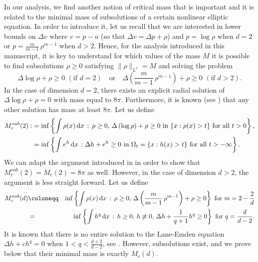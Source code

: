 \documentclass[11pt,a4paper]{article}
\numberwithin{equation}{section}
\theoremstyle{plain}
\theoremstyle{remark}
\newcommand{\diff}{\mathop{}\!\mathrm{d}}
\begin{document}
In our analysis, we find another notion of critical mass that is important and it is related to the minimal mass of subsolutions of a certain nonlinear elliptic equation. In order to introduce it, let us recall that we are interested in lower bounds on $\Delta v$ where $v=p-u$ (so that $\Delta v=\Delta p+\rho$) and $p=\log\rho$ when $d=2$ or $p=\frac{m}{m-1}\,\rho^{m-1}$ when $d>2$. Hence, for the analysis introduced in this manuscript, it is key to understand for which values of the mass $M$ it is possible to find subsolutions $\rho\geq 0$ satisfying $\|\rho\|_{L^1}=M$ and solving the problem
\begin{equation*}
    \Delta\log\rho + \rho\geq 0 \, \, (\text{if } d=2) \quad\text{or}\quad\Delta \left(\frac{m}{m-1}\,\rho^{m-1}\right) + \rho\geq 0 \, \, (\text{if } d>2).
\end{equation*}
In the case of dimension $d=2$, there exists an explicit radial solution of $\Delta\log\rho + \rho= 0$ with mass equal to $8\pi$. Furthermore, it is known (see \cite[Lemma 1.1]{Chen_Li91}) that any other solution has mass at least $8\pi$. Let us define  
\begin{equation*}
\begin{split}
M^{sub}_c(2):&=\inf\left\{\int \rho(x)\diff x\,:\,\rho\geq 0, \, \Delta \left(\log\rho \right) + \rho\geq 0\text{ in $\{x: \rho(x)>t\}$ for all $t>0$}\right\}, \\
&=\inf\left\{\int e^h\diff x\,: \Delta h + e^h\geq 0\text{ in $\Omega_t=\{x: h(x)>t\}$ for all $t>-\infty$}\right\}.\notag
\end{split}
\end{equation*}
%
We can adapt the argument introduced in  \cite[Lemma 1.1]{Chen_Li91} in order to show that  $M^{sub}_c(2)=M_c(2)=8 \pi$ as well. However, in the case of dimension $d > 2$, the argument is less straight forward. Let us define
\begin{eqnarray}
M^{sub}_c(d)&\coloneqq&\inf\left\{\int \rho(x)\diff x\,:\,\rho\geq 0, \, \Delta \left(\frac{m}{m-1}\,\rho^{m-1} \right) + \rho\geq 0\right\}\mbox{ for }m=2-\frac2d \label{def:Mc LaneEmden}\\
&=&\inf\left\{\int h^q\diff x\,:\,h\geq 0,\, h\not\equiv0, \, \Delta h + \frac{1}{q+1}h^q\geq 0\right\}\mbox{ for }q=\frac{d}{d-2}.\notag
\end{eqnarray}
It is known that there is no entire solution to the Lane-Emden equation $\Delta h + ch^q=0$ when $1< q< \frac{d+2}{d-2}$, see \cite{Bahri_Lions92}. However, subsolutions exist, and we prove below that their minimal mass is exactly $M_c(d)$.
\end{document}
